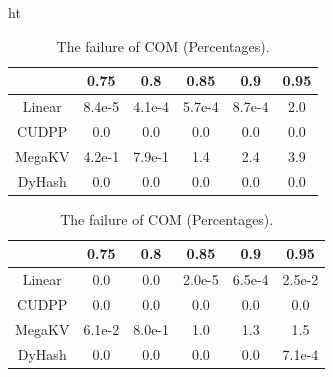 \begin{table}{ht}
\begin{minipage}{0.45\linewidth}
		\begin{tabular}{|c|c|c|c|c|c|}
			\hline
			& 0.75 & 0.8 & 0.85 & 0.9 & 0.95\\ \hline
			Linear &8.4e-5 & 4.1e-4 &5.7e-4  & 8.7e-4 & 2.0 \\ \hline
			CUDPP & 0.0 & 0.0 &0.0  & 0.0 & 0.0 \\ \hline
			MegaKV &4.2e-1 & 7.9e-1 &1.4  & 2.4 & 3.9 \\ \hline
			DyHash &0.0 & 0.0 &0.0  & 0.0 & 0.0 \\ \hline
		\end{tabular}
		\label{tab:fail:rand}
	\end{minipage}
	\begin{minipage}{0.45\linewidth}\centering
		\caption{The failure of COM (Percentages).}
		\begin{tabular}{|c|c|c|c|c|c|}
			\hline
			& 0.75 & 0.8 & 0.85 & 0.9 & 0.95\\ \hline
			Linear &0.0 & 0.0 &2.0e-5  & 6.5e-4 & 2.5e-2 \\ \hline
			CUDPP & 0.0 & 0.0 &0.0  & 0.0 & 0.0 \\ \hline
			MegaKV &6.1e-2 & 8.0e-1 &1.0  & 1.3 & 1.5 \\ \hline
			DyHash &0.0 & 0.0 &0.0  & 0.0 & 7.1e-4 \\ \hline
		\end{tabular}
		\label{tab:fail:com}
	\end{minipage}
\end{table}
